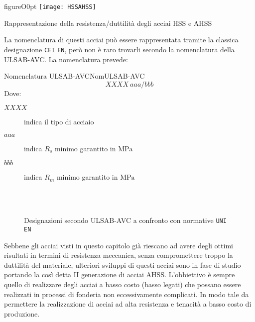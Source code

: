 \begin{wrapfloat}{figure}{O}{0pt}
\texttt{[image: HSSAHSS]}
\caption{Rappresentazione della resistenza/duttilità degli acciai HSS e AHSS}
\label{fig:HSSAHSS}
\end{wrapfloat}

La nomenclatura di questi acciai può essere rappresentata tramite la classica designazione 
\texttt{CEI} \texttt{EN}, però non è raro trovarli secondo la nomenclatura della \ac{ULSAB-AVC}.
La nomenclatura prevede:

\begin{definition}{Nomenclatura \ac{ULSAB-AVC}}{NomULSAB-AVC}
\begin{equation}
XXXX \: aaa/bbb
\end{equation}
Dove:
\begin{description}
\item[$XXXX$] indica il tipo di acciaio
\item[$aaa$] indica $R_s$ minimo garantito in $\unit{\MPa}$
\item[$bbb$] indica $R_m$ minimo garantito in $\unit{\MPa}$
\end{description}
\end{definition}

\begin{figure}
\centering
{}\\
\\
\caption{Designazioni secondo \ac{ULSAB-AVC} a confronto con normative \texttt{UNI} \texttt{EN}}
\label{fig:ConfDeignazioni}
\end{figure}

Sebbene gli acciai visti in questo capitolo già riescano ad avere degli ottimi risultati in termini 
di resistenza meccanica, senza compromettere troppo la duttilità del materiale, ulteriori
sviluppi di questi acciai sono in fase di studio portando la così detta II generazione di 
acciai \ac{AHSS}.
L'obbiettivo è sempre quello di realizzare degli acciai a basso costo (basso legati) che 
possano essere realizzati in processi di fonderia non eccessivamente complicati.
In modo tale da permettere la realizzazione di acciai ad alta resistenza e tenacità a 
basso costo di produzione.

